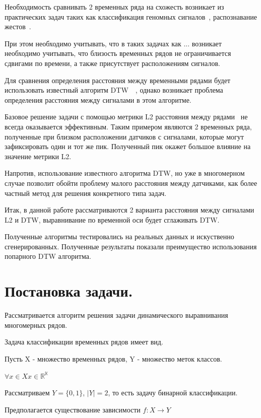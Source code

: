 \documentclass[12pt, twoside]{article}
\begin{document}
Необходимость сравнивать 2 временных ряда на схожесть возникает из практических задач таких как классификация геномных сигналов~\cite{Skutkova2013}, распознавание жестов~\cite{Holt2007}.  


При этом необходимо учитывать, что в таких задачах как ... возникает необходимо учитывать, что близость временных рядов не ограничивается сдвигами по времени, а также присутствует  расположениям сигналов.

Для сравнения определения расстояния между временными рядами будет использовать известный алгоритм DTW~\cite{Keogh01derivativedynamic}~\cite{SalvadorC07}, однако возникает проблема определения расстояния между сигналами в этом алгоритме.

Базовое решение задачи с помощью метрики L2 расстояния между рядами~\cite{Sanguasat2012} не всегда оказывается эффективным. Таким примером являются 2 временных ряда, полученные при близком расположении датчиков с сигналами, которые могут зафиксировать один и тот же пик. Полученный пик окажет большое влияние на значение метрики L2.

Напротив, использование известного алгоритма DTW, но уже в многомерном случае позволит обойти проблему малого расстояния между датчиками, как более частный метод для решения конкретного типа задач.

Итак, в данной работе рассматриваются 2 варианта расстояния между сигналами L2 и DTW, выравнивание по временной оси будет сглаживать DTW.

Полученные алгоритмы тестировались на реальных данных и искуственно сгенерированных. Полученные результаты показали преимущество использования попарного DTW алгоритма.


\section{Постановка задачи.}

Рассматривается алгоритм решения задачи динамического выравнивания многомерных рядов.

Задача классификации временных рядов имеет вид.

Пусть X - множество временных рядов, Y - множество меток классов.

$\forall x \in X x \in \mathbb{R^K}$

Рассматриваем $Y = \{0, 1\}$,  $|Y| = 2$, то есть задачу бинарной классификации.

Предполагается существование зависимости $f: X \rightarrow Y$
\end{document}
